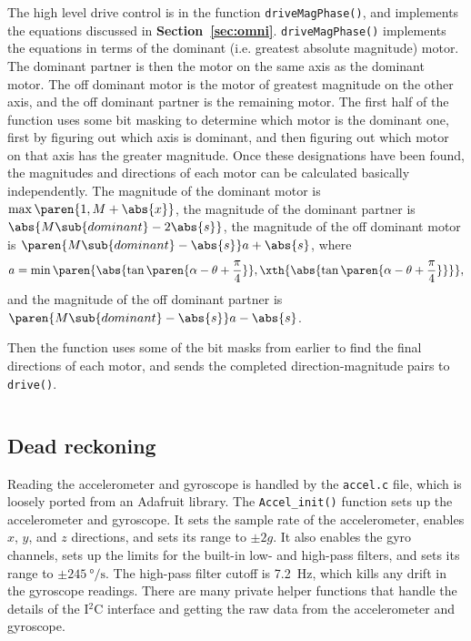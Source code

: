 \documentclass[letterpaper, 11pt]{article}
\newcommand*{\secref}[1]{\textbf{Section~\ref{#1}}}
\newcommand{\iic}{I$^2$C\xspace}
\begin{document}
\begin{enumerate}[label=\textbf{\arabic*.}]
\begin{mdframed}[backgroundcolor=bg]
    \inputminted[breaklines]{c}{files/excerpts/drive.c}
\end{mdframed}

The high level drive control is in the function \verb|driveMagPhase()|, and implements the equations discussed in \secref{sec:omni}. \verb|driveMagPhase()| implements the equations in terms of the dominant (i.e. greatest absolute magnitude) motor. The dominant partner is then the motor on the same axis as the dominant motor. The off dominant motor is the motor of greatest magnitude on the other axis, and the off dominant partner is the remaining motor. The first half of the function uses some bit masking to determine which motor is the dominant one, first by figuring out which axis is dominant, and then figuring out which motor on that axis has the greater magnitude. Once these designations have been found, the magnitudes and directions of each motor can be calculated basically independently. The magnitude of the dominant motor is $\max\paren{1, M + \abs{x}}$, the magnitude of the dominant partner is $\abs{M\sub{dominant} - 2\abs{s}}$, the magnitude of the off dominant motor is $\paren{M\sub{dominant} - \abs{s}}a + \abs{s}$, where 
\[ a = \min\paren{\abs{\tan\paren{\alpha - \theta + \frac{\pi}{4}}}, \xth{\abs{\tan\paren{\alpha - \theta + \frac{\pi}{4}}}}},\]
and the magnitude of the off dominant partner is $\paren{M\sub{dominant} - \abs{s}}a - \abs{s}$.

Then the function uses some of the bit masks from earlier to find the final directions of each motor, and sends the completed direction-magnitude pairs to \verb|drive()|.

\begin{mdframed}[backgroundcolor=bg]
    \inputminted[breaklines]{c}{files/excerpts/driveMagPhase.c}
\end{mdframed}

\subsection{Dead reckoning}
Reading the accelerometer and gyroscope is handled by the \verb|accel.c| file, which is loosely ported from an Adafruit library. The \verb|Accel_init()| function sets up the accelerometer and gyroscope. It sets the sample rate of the accelerometer, enables $x$, $y$, and $z$ directions, and sets its range to $\pm 2g$. It also enables the gyro channels, sets up the limits for the built-in low- and high-pass filters, and sets its range to $\pm \SI{245}{\degree\per\second}$. The high-pass filter cutoff is \SI{7.2}{Hz}, which kills any drift in the gyroscope readings. There are many private helper functions that handle the details of the \iic interface and getting the raw data from the accelerometer and gyroscope. 


\end{enumerate}
\end{document}
